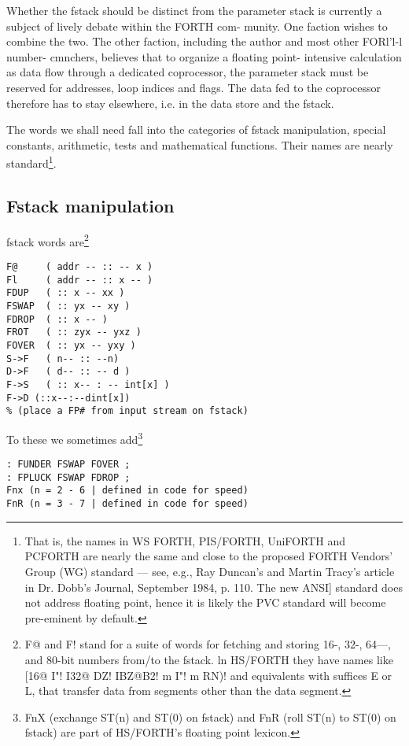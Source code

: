 \leftbar[1\linewidth] 
Whether the fstack should be distinct from the parameter stack
is currently a subject of lively debate within the FORTH com-
munity. One faction wishes to combine the two. The other
faction, including the author and most other FORl'l-l number-
cmnchers, believes that to organize a floating point- intensive
calculation as data ﬂow through a dedicated coprocessor, the
parameter stack must be reserved for addresses, loop indices and
ﬂags. The data fed to the coprocessor therefore has to stay
elsewhere, i.e. in the data store and the fstack.
\endleftbar

The words we shall need fall into the categories of fstack 
manipulation, special constants, arithmetic, tests and mathematical functions.
Their names are nearly standard\footnote{That is, the names in WS FORTH, PIS/FORTH, UniFORTH and PCFORTH are nearly the
same and close to the proposed FORTH Vendors' Group (WG) standard — see, e.g., Ray
Duncan's and Martin Tracy's article in Dr. Dobb's Journal, September 1984, p. 110. The new
ANSI] standard does not address floating point, hence it is likely the PVC standard will become
pre-eminent by default.}.

\subsection{Fstack manipulation}
 fstack words are\footnote{F@ and F! stand for a suite of words for fetching and storing 16-, 32-, 64—, and 80-bit numbers
from/to the fstack. ln HS/FORTH they have names like [16@ I"! I32@ DZ! IBZ@B2!
m I"! m RN)! and equivalents with suffices E or L, that transfer data from segments
other than the data segment.}
\begin{verbatim}
F@     ( addr -- :: -- x )
Fl     ( addr -- :: x -- )
FDUP   ( :: x -- xx )
FSWAP  ( :: yx -- xy )
FDROP  ( :: x -- )
FROT   ( :: zyx -- yxz )
FOVER  ( :: yx -- yxy )
S->F   ( n-- :: --n)
D->F   ( d-- :: -- d )
F->S   ( :: x-- : -- int[x] )
F->D (::x--:--dint[x])
% (place a FP# from input stream on fstack)
\end{verbatim}
 
To these we sometimes add\footnote{FnX (exchange ST(n) and ST(0) on fstack) and FnR (roll ST(n) to ST(0) on fstack) are part of HS/FORTH’s floating point lexicon.}

\begin{verbatim}
: FUNDER FSWAP FOVER ;
: FPLUCK FSWAP FDROP ;
Fnx (n = 2 - 6 | defined in code for speed)
FnR (n = 3 - 7 | defined in code for speed)
\end{verbatim}

